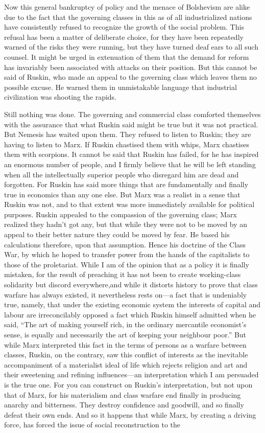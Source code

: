 \documentclass{book}
\begin{document}
Now this general bankruptcy of policy and the menace of Bolshevism are alike due to the fact that the governing classes in this as of all industrialized nations have consistently refused to recognize the growth of the social problem. This refusal has been a matter of deliberate choice, for they have been repeatedly warned of the risks they were running, but they have turned deaf ears to all such counsel. It might be urged in extenuation of them that the demand for reform has invariably been associated with attacks on their position. But this cannot be said of Ruskin, who made an appeal to the governing class which leaves them no possible excuse. He warned them in unmistakable language that industrial civilization was shooting the rapids.

Still nothing was done. The governing and commercial class comforted themselves with the assurance that what Ruskin said might be true but it was not practical. But Nemesis has waited upon them. They refused to listen to Ruskin; they are having to listen to Marx. If Ruskin chastised them with whips, Marx chastises them with scorpions. It cannot be said that Ruskin has failed, for he has inspired an enormous number of people, and I firmly believe that he will be left standing when all the intellectually superior people who disregard him are dead and forgotten. For Ruskin has said more things that are fundamentally and finally true in economics than any one else. But Marx was a realist in a sense that Ruskin was not, and to that extent was more immediately available for political purposes. Ruskin appealed to the compassion of the governing class; Marx realized they hadn’t got any, but that while they were not to be moved by an appeal to their better nature they could be moved by fear. He based his calculations therefore, upon that assumption. Hence his doctrine of the Class War, by which he hoped to transfer power from the hands of the capitalists to those of the proletariat. While I am of the opinion that as a policy it is finally mistaken, for the result of preaching it has not been to create working-class solidarity but discord everywhere,\footnotemark[2] and while it distorts history to prove that class warfare has always existed, it nevertheless rests on—a fact that is undeniably true, namely, that under the existing economic system the interests of capital and labour are irreconcilably opposed a fact which Ruskin himself admitted when he said, “The art of making yourself rich, in the ordinary mercantile economist’s sense, is equally and necessarily the art of keeping your neighbour poor.” But while Marx interpreted this fact in the terms of persons as a warfare between classes, Ruskin, on the contrary, saw this conflict of interests as the inevitable accompaniment of a materialist ideal of life which rejects religion and art and their sweetening and refining influences—an interpretation which I am persuaded is the true one. For you can construct on Ruskin’s interpretation, but not upon that of Marx, for his materialism and class warfare end finally in producing anarchy and bitterness. They destroy confidence and goodwill, and so finally defeat their own ends. And so it happens that while Marx, by creating a driving force, has forced the issue of social reconstruction to the 
\end{document}
